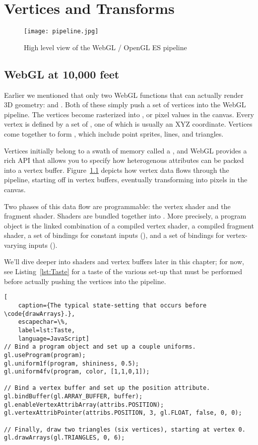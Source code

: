 \chapter{Vertices and Transforms}

\begin{figure}[htb]\centering
  \texttt{[image: pipeline.jpg]}
  \caption{High level view of the WebGL / OpenGL ES pipeline}
  \label{fig:AssemblyLine}
\end{figure}

\section{WebGL at 10,000 feet}

Earlier we mentioned that only two WebGL functions that can actually render 3D geometry:  and .  Both of these simply push a set of  vertices into the WebGL pipeline.  The vertices become rasterized into  , or pixel values in the canvas.  Every vertex is defined by a set of , one of which is usually an XYZ coordinate.  Vertices come together to form , which include point sprites, lines, and triangles.

Vertices initially belong to a swath of memory called a , and WebGL provides a rich API that allows you to specify how heterogenous attributes can be packed into a vertex buffer.  Figure~\ref{fig:AssemblyLine} depicts how vertex data flows through the pipeline, starting off in vertex buffers, eventually transforming into pixels in the canvas.

Two phases of this data flow are programmable: the vertex shader and the fragment shader.  Shaders are bundled together into  .   More precisely, a program object is the linked combination of a compiled vertex shader, a compiled fragment shader, a set of bindings for constant inputs (), and a set of bindings for vertex-varying inputs ().

We'll dive deeper into shaders and vertex buffers later in this chapter; for now, see Listing~\ref{lst:Taste} for a taste of the various set-up that must be performed before actually pushing the vertices into the pipeline.

\begin{lstlisting}[
    caption={The typical state-setting that occurs before \code{drawArrays}.},
    escapechar=\%,
    label=lst:Taste,
    language=JavaScript]
// Bind a program object and set up a couple uniforms.
gl.useProgram(program);
gl.uniform1f(program, shininess, 0.5);
gl.uniform4fv(program, color, [1,1,0,1]);

// Bind a vertex buffer and set up the position attribute.
gl.bindBuffer(gl.ARRAY_BUFFER, buffer);
gl.enableVertexAttribArray(attribs.POSITION);
gl.vertexAttribPointer(attribs.POSITION, 3, gl.FLOAT, false, 0, 0);

// Finally, draw two triangles (six vertices), starting at vertex 0.
gl.drawArrays(gl.TRIANGLES, 0, 6);
\end{lstlisting}

